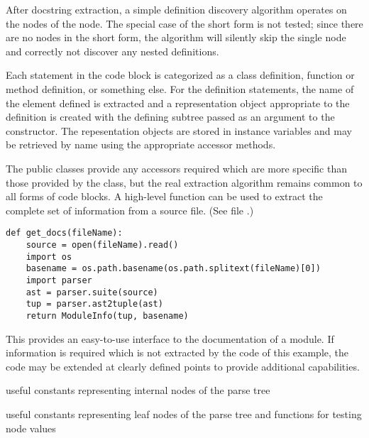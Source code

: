 After docstring extraction, a simple definition discovery
algorithm operates on the  nodes of the
 node.  The special case of the short form is not
tested; since there are no  nodes in the short form,
the algorithm will silently skip the single 
node and correctly not discover any nested definitions.

Each statement in the code block is categorized as
a class definition, function or method definition, or
something else.  For the definition statements, the name of the
element defined is extracted and a representation object
appropriate to the definition is created with the defining subtree
passed as an argument to the constructor.  The repesentation objects
are stored in instance variables and may be retrieved by name using
the appropriate accessor methods.

The public classes provide any accessors required which are more
specific than those provided by the  class, but
the real extraction algorithm remains common to all forms of code
blocks.  A high-level function can be used to extract the complete set
of information from a source file.  (See file .)

\begin{verbatim}
def get_docs(fileName):
    source = open(fileName).read()
    import os
    basename = os.path.basename(os.path.splitext(fileName)[0])
    import parser
    ast = parser.suite(source)
    tup = parser.ast2tuple(ast)
    return ModuleInfo(tup, basename)
\end{verbatim}
%
This provides an easy-to-use interface to the documentation of a
module.  If information is required which is not extracted by the code
of this example, the code may be extended at clearly defined points to
provide additional capabilities.

\begin{seealso}

%
  {useful constants representing internal nodes of the parse tree}

%
  {useful constants representing leaf nodes of the parse tree and
functions for testing node values}

\end{seealso}
